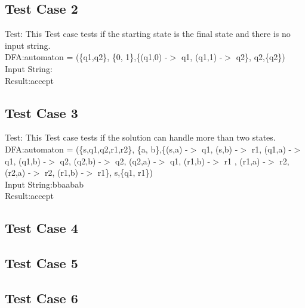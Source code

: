 \documentclass[a4paper, 10pt]{article}
\begin{document}
\subsection{Test Case 2}
Test: This Test case tests if the starting state is the final state and there is no input string.\\
DFA:automaton = (\{q1,q2\}, \{0, 1\},\{(q1,0) -$>$ q1, (q1,1) -$>$ q2\}, q2,\{q2\})\\
Input String:\\
Result:accept\\
\subsection{Test Case 3}
Test: This Test case tests if the solution can handle more than two states.\\
DFA:automaton = (\{s,q1,q2,r1,r2\}, \{a, b\},\{(s,a) -$>$ q1, (s,b) -$>$ r1, (q1,a) -$>$ q1, (q1,b) -$>$ q2, (q2,b) -$>$ q2, (q2,a) -$>$ q1, (r1,b) -$>$ r1
, (r1,a) -$>$ r2, (r2,a) -$>$ r2, (r1,b) -$>$ r1\}, s,\{q1, r1\})\\
Input String:bbaabab\\
Result:accept\\
\subsection{Test Case 4}
\subsection{Test Case 5}
\subsection{Test Case 6}
\end{document}
